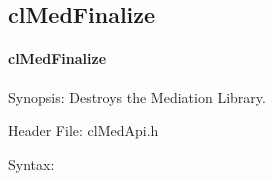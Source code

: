 \begin{flushleft}
\subsection{clMedFinalize}
\hypertarget{pagemed102}{}\paragraph{cl\-Med\-Finalize}\label{pagemed102}
\begin{Desc}
\item[Synopsis:]Destroys the Mediation Library.\end{Desc}
\begin{Desc}
\item[Header File:]clMedApi.h\end{Desc}
\begin{Desc}
\item[Syntax:]


\end{Desc}
\end{flushleft}
